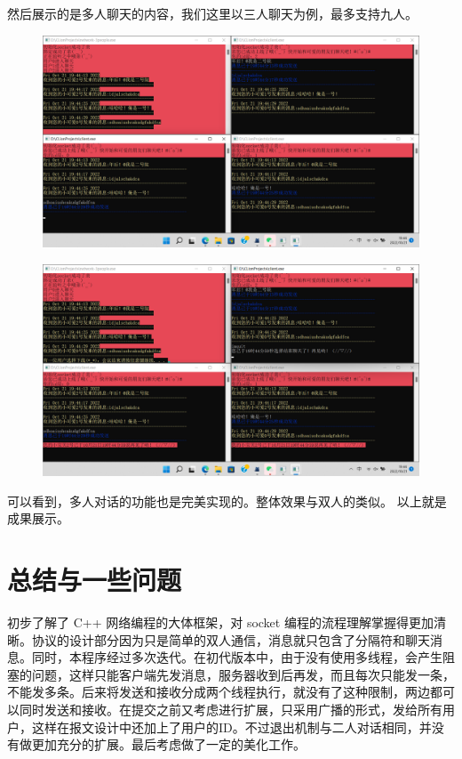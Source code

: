 \documentclass[UTF8,a4paper,10pt]{ctexart}
\begin{document}
然后展示的是多人聊天的内容，我们这里以三人聊天为例，最多支持九人。
\begin{figure}[H]
    \centering
    \includegraphics[scale=0.4]{4.png}
    \label{fig:4}
\end{figure}
\begin{figure}[H]
    \centering
    \includegraphics[scale=0.4]{5.png}
    \label{fig:5}
\end{figure}
可以看到，多人对话的功能也是完美实现的。整体效果与双人的类似。
以上就是成果展示。
\section{总结与一些问题}
初步了解了 C++ 网络编程的大体框架，对 socket 编程的流程理解掌握得更加清晰。协议的设计部分因为只是简单的双人通信，消息就只包含了分隔符和聊天消息。同时，本程序经过多次迭代。在初代版本中，由于没有使用多线程，会产生阻塞的问题，这样只能客户端先发消息，服务器收到后再发，而且每次只能发一条，不能发多条。后来将发送和接收分成两个线程执行，就没有了这种限制，两边都可以同时发送和接收。在提交之前又考虑进行扩展，只采用广播的形式，发给所有用户，这样在报文设计中还加上了用户的ID。不过退出机制与二人对话相同，并没有做更加充分的扩展。最后考虑做了一定的美化工作。
\end{document}
